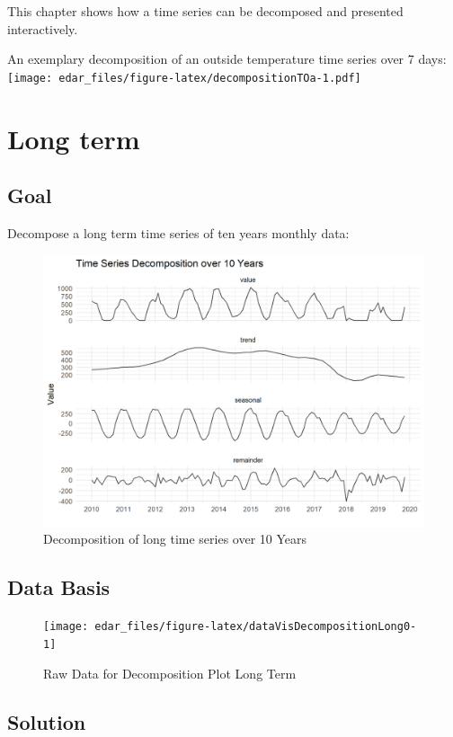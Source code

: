 \documentclass[
  a4paperpaper,
]{book}
\begin{document}
This chapter shows how a time series can be decomposed and presented interactively.

An exemplary decomposition of an outside temperature time series over 7 days:
\texttt{[image: edar\_files/figure-latex/decompositionTOa-1.pdf]}

\newpage

\hypertarget{long-term}{%
\section{Long term}\label{long-term}}

\hypertarget{goal-4}{%
\subsection{Goal}\label{goal-4}}

Decompose a long term time series of ten years monthly data:

\begin{figure}
\includegraphics[width=0.7\linewidth]{images/plotDecompositionLong} \caption{Decomposition of long time series over 10 Years}\label{fig:unnamed-chunk-14}
\end{figure}

\hypertarget{data-basis-4}{%
\subsection{Data Basis}\label{data-basis-4}}

\begin{figure}
\texttt{[image: edar\_files/figure-latex/dataVisDecompositionLong0-1]} \caption{Raw Data for Decomposition Plot Long Term}\label{fig:dataVisDecompositionLong0}
\end{figure}

\newpage

\hypertarget{solution-4}{%
\subsection{Solution}\label{solution-4}}
\end{document}
